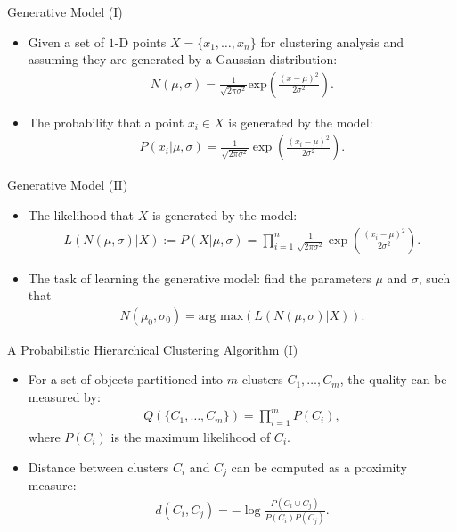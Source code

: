 \begin{frame}{Generative Model (I)}
	\centering
	\begin{itemize}
		\item Given a set of $1$-D points $X = \{x_1, \ldots, x_n\}$ for 
		clustering analysis and assuming they are generated by a Gaussian 
		distribution:
		\begin{align}
			N(\mu,\sigma) = \frac{1}{\sqrt{2 \pi \sigma^2}} 
			\text{exp}\left({\frac{(x-\mu)^2}{2\sigma^2}}\right). 
		\end{align}
		\item The probability that a point $x_i \in X$ is generated by the 
		model:
		\begin{align}
			P(x_i \vert \mu, \sigma) = \frac{1}{\sqrt{2\pi\sigma^2}} \exp\left( 
			\frac{(x_i-\mu)^2}{2\sigma^2}\right). 
		\end{align}
	\end{itemize}
\end{frame}

\begin{frame}{Generative Model (II)}
	\centering
	\begin{itemize}
		\item The likelihood that $X$ is generated by the model:
		\begin{align}
			L(N(\mu,\sigma) \vert X) := P(X \vert \mu, \sigma) = 
			\prod_{i=1}^{n} \frac{1}{\sqrt{2\pi\sigma^2}} \exp\left( 
			\frac{(x_i-\mu)^2}{2\sigma^2}\right). 
		\end{align}
		\item The task of learning the generative model: find the parameters 
		$\mu$ and $\sigma$, such that
		\begin{align}
			N(\mu_0,\sigma_0) = \text{arg max}\left( L(N(\mu,\sigma)\vert X) 
			\right). 
		\end{align}
	\end{itemize}
\end{frame}

\begin{frame}{A Probabilistic Hierarchical Clustering Algorithm (I)}
	\centering
	\begin{itemize}
		\item For a set of objects partitioned into $m$ clusters $C_1, \ldots, 
		C_m$,
		the quality can be measured by:
		\begin{align}
			Q(\{C_1, \ldots, C_m\}) = \prod_{i=1}^{m} P(C_i), 
		\end{align}
		where $P(C_i)$ is the maximum likelihood of $C_i$.
		\item Distance between clusters $C_i$ and $C_j$ can be computed as a 
		proximity measure:
		\begin{align}
			d(C_i,C_j) = - \log \frac{P(C_i \cup C_j)}{P(C_i)P(C_j)}. 
		\end{align}
	\end{itemize}
\end{frame}

